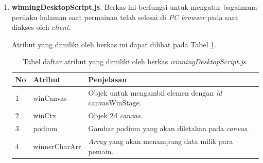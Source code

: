 \begin{enumerate}
\begin{enumerate}
\begin{enumerate}
%				
%			
%				
			
			\item \textbf{winningDesktopScript.js}, Berkas ini berfungsi untuk mengatur bagaimana perilaku halaman saat permainan telah selesai di \textit{PC browser} pada saat diakses oleh \textit{client}.
			
			Atribut yang dimiliki oleh berkas ini dapat dilihat pada Tabel \ref{table:atribut_winningDesktopScript}.
			\begin{table}[H]
				\centering
				\caption{Tabel daftar atribut yang dimiliki oleh berkas \textit{winningDesktopScript.js}.}
				\begin{tabular}{|p{0.35cm}|p{3cm}|p{7cm}|}
					\hline
					No & Atribut & Penjelasan \\ \hline
					1 & winCanvas & Objek untuk mengambil elemen dengan \textit{id} canvasWinStage. \\ \hline
					2 & winCtx & Objek 2d \textit{canvas}. \\ \hline
					3 & podium & Gambar podium yang akan diletakan pada \textit{canvas}. \\ \hline
					4 & winnerCharArr & \textit{Array} yang akan menampung data milik para pemain. \\ \hline
				\end{tabular}
				\label{table:atribut_winningDesktopScript}
			\end{table}
			

\end{enumerate}
\end{enumerate}
\end{enumerate}

